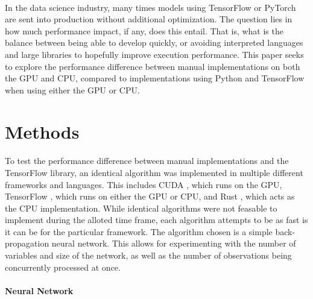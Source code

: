 \documentclass[12pt]{article}
\begin{document}
\paragraph{}
In the data science industry, many times models using TensorFlow or PyTorch are sent into production without additional optimization.
The question lies in how much performance impact, if any, does this entail.
That is, what is the balance between being able to develop quickly, or avoiding interpreted languages and large libraries to hopefully improve execution performance.
This paper seeks to explore the performance difference between manual implementations on both the GPU and CPU, compared to implementations using Python \cite{lang_python} and TensorFlow \cite{lib_tensorflow} when using either the GPU or CPU.

\section{Methods}


\paragraph{}
To test the performance difference between manual implementations and the TensorFlow library, an identical algorithm was implemented in multiple different frameworks and languages.
This includes CUDA \cite{lib_cuda}, which runs on the GPU, TensorFlow \cite{lib_tensorflow}, which runs on either the GPU or CPU, and Rust \cite{lang_rust}, which acts as the CPU implementation.
While identical algorithms were not feasable to implement during the alloted time frame, each algorithm attempts to be as fast is it can be for the particular framework.
The algorithm chosen is a simple back-propagation neural network.
This allows for experimenting with the number of variables and size of the network, as well as the number of observations being concurrently processed at once.


\paragraph{Neural Network}
\end{document}
